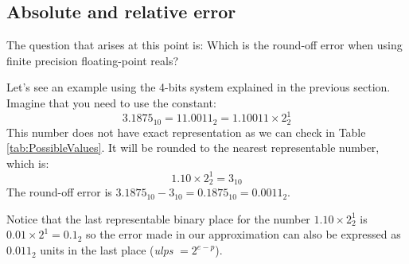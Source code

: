 


        \subsection{Absolute and relative error}


The question that arises at this point is: Which is the round-off error when using finite precision floating-point reals?

Let's see an example using the 4-bits system explained in the previous section. Imagine that you need to use the constant: 
$$
3.1875_{10} = 11.0011_2 = 1.10011\times 2^1_2
$$
This number does not have exact representation as we can check in Table \ref{tab:PossibleValues}. It will be rounded to the nearest representable number, which is: 
$$
1.10\times2^1_2 = 3_{10}
$$
The round-off error is $3.1875_{10} - 3_{10} = 0.1875_{10} = 0.0011_2$.
 
Notice that the last representable binary place for the number $1.10\times2^1_2$ is $0.01\times2^1 = 0.1_2$ 
so the error made in our approximation can also be expressed as $0.011_2$ units in the last place (\textit{ulps} $= 2^{e-p}$). 





